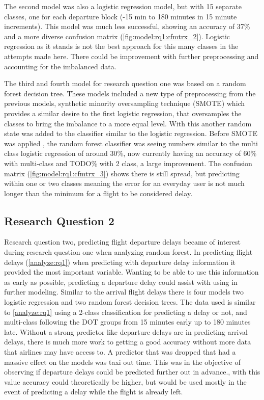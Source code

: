\documentclass[a4paper,12pt]{article}
\begin{document}
The second model was also a logistic regression model, but with 15 separate classes, one for each departure block (-15 min to 180 minutes in 15 minute increments). This model was much less successful,
showing an accuracy of 37\% and a more diverse confusion matrix (\ref{fig:model:rq1:cfmtrx_2}). Logistic regression as it stands is not the best approach for this many classes in the attempts made here. There could be improvement with further preprocessing and accounting for the imbalanced data.

The third and fourth model for research question one was based on a random forest decision tree. These models included a new type of preprocessing from the previous models, synthetic minority oversampling technique (SMOTE) which provides 
a similar desire to the first logistic regression, that oversamples the classes to bring the imbalance to a more equal level. With this another random state was added to the classifier similar to the logistic regression.
Before SMOTE was applied , the random forest classifier was seeing numbers similar to the multi class logistic regression of around 30\%, now currently having an accuracy of 60\% with multi-class and TODO\% with 2 class, a large improvement. The confusion matrix (\ref{fig:model:rq1:cfmtrx_3}) shows there is still spread,
but predicting within one or two classes meaning the error for an everyday user is not much longer than the minimum for a flight to be considered delay. 

\subsection{Research Question 2}

Research question two, predicting flight departure delays became of interest during research question one when analyzing random forest. In predicting
flight delays (\ref{analyze:rq1}) when predicting with departure delay information it provided the most important variable. Wanting to be able to use this information as early
as possible, predicting a departure delay could assist with using in further modeling. Similar to the arrival flight delays there is four models two logistic regression and two random forest decision trees.
The data used is similar to \ref{analyze:rq1} using a 2-class classification for predicting a delay or not, and multi-class following the DOT groups from 15 minutes early up to 180 minutes late. Without a strong predictor 
like departure delays are in predicting arrival delays, there is much more work to getting a good accuracy without more data that airlines may have access to. A predictor that was dropped that had a massive effect on the models was taxi out time.
This was in the objective of observing if departure delays could be predicted further out in advance., with this value accuracy could theoretically be higher, but would be used mostly in the event of predicting a delay while the flight is already left.
\end{document}
